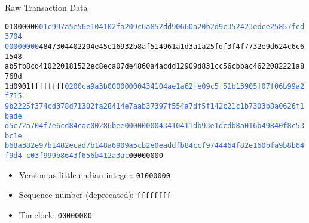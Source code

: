 \documentclass[]{beamer}
\begin{document}


\begin{frame}{Raw Transaction Data}
\begin{scriptsize}
\texttt{01000000\textcolor{highlight}{01c997a5e56e104102fa209c6a852dd90660a20b2d9c352423edce25857fcd3704
00000000}\textcolor{focus}{4847304402204e45e16932b8af514961a1d3a1a25fdf3f4f7732e9d624c6c61548
ab5fb8cd410220181522ec8eca07de4860a4acdd12909d831cc56cbbac4622082221a8768d
1d0901}ffffffff\textcolor{highlight}{0200ca9a3b00000000434104ae1a62fe09c5f51b13905f07f06b99a2f715
9b2225f374cd378d71302fa28414e7aab37397f554a7df5f142c21c1b7303b8a0626f1bade
d5c72a704f7e6cd84cac00286bee0000000043410411db93e1dcdb8a016b49840f8c53bc1e
b68a382e97b1482ecad7b148a6909a5cb2e0eaddfb84ccf9744464f82e160bfa9b8b64f9d4
c03f999b8643f656b412a3ac}00000000}
\vspace{1em}
\end{scriptsize}
\scriptsize
\begin{itemize}
	\item<2-> Version as little-endian integer: \texttt{01000000}
	\item<2-> Sequence number (deprecated): \texttt{ffffffff}
	\item<2-> Timelock: \texttt{00000000}
\end{itemize}
\end{frame}
\end{document}
